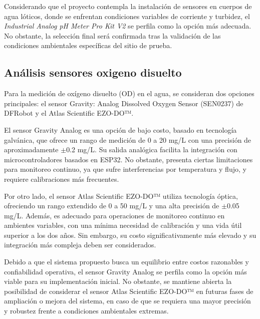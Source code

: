 Considerando que el proyecto contempla la instalación de sensores en cuerpos de agua lóticos, donde se enfrentan condiciones variables de corriente y turbidez, el \textit{Industrial Analog pH Meter Pro Kit V2} se perfila como la opción más adecuada. No obstante, la selección final será confirmada tras la validación de las condiciones ambientales específicas del sitio de prueba.


\subsection{Análisis sensores oxigeno disuelto}


Para la medición de oxígeno disuelto (OD) en el agua, se consideran dos opciones principales: el sensor Gravity: Analog Dissolved Oxygen Sensor (SEN0237) de DFRobot y el Atlas Scientific EZO-DO™.

El sensor Gravity Analog es una opción de bajo costo, basado en tecnología galvánica, que ofrece un rango de medición de 0 a 20 mg/L con una precisión de aproximadamente $\pm$0.2 mg/L. Su salida analógica facilita la integración con microcontroladores basados en ESP32. No obstante, presenta ciertas limitaciones para monitoreo continuo, ya que sufre interferencias por temperatura y flujo, y requiere calibraciones más frecuentes.

Por otro lado, el sensor Atlas Scientific EZO-DO™ utiliza tecnología óptica, ofreciendo un rango extendido de 0 a 50 mg/L y una alta precisión de $\pm$0.05 mg/L. Además, es adecuado para operaciones de monitoreo continuo en ambientes variables, con una mínima necesidad de calibración y una vida útil superior a los dos años. Sin embargo, su costo significativamente más elevado y su integración más compleja deben ser considerados.

Debido a que el sistema propuesto busca un equilibrio entre costos razonables y confiabilidad operativa, el sensor Gravity Analog se perfila como la opción más viable para su implementación inicial. No obstante, se mantiene abierta la posibilidad de considerar el sensor Atlas Scientific EZO-DO™ en futuras fases de ampliación o mejora del sistema, en caso de que se requiera una mayor precisión y robustez frente a condiciones ambientales extremas.


